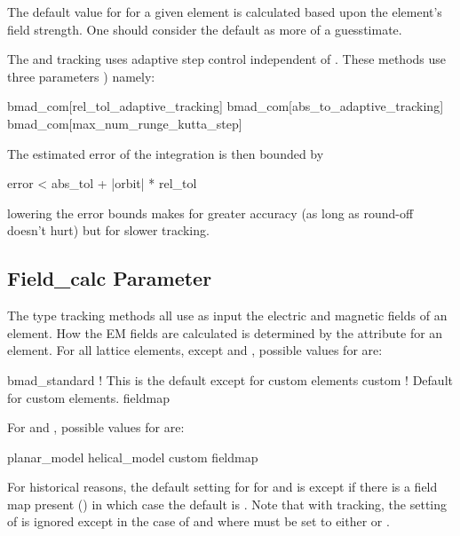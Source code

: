 The default value for  for a given element is calculated based upon the element's field
strength. One should consider the default as more of a guesstimate.

The  and  tracking uses adaptive step
control independent of . These methods use three  parameters
) namely:
\begin{example}
  bmad_com[rel_tol_adaptive_tracking]
  bmad_com[abs_to_adaptive_tracking]
  bmad_com[max_num_runge_kutta_step]
\end{example}
The estimated error of the integration is then bounded by
\begin{example}
  error < abs_tol + |orbit| * rel_tol
\end{example}
lowering the error bounds makes for greater accuracy (as long as round-off 
doesn't hurt) but for slower tracking. 

\subsection{Field_calc Parameter}
\label{s:field.calc}

The  type tracking methods all use as input the electric and magnetic fields of
an element. How the EM fields are calculated is determined by the  attribute for an
element.  For all lattice elements, except  and , possible values for
 are:
\begin{example}
  bmad_standard     ! This is the default except for custom elements
  custom            ! Default for custom elements.
  fieldmap
\end{example}
For  and , possible values for  are:
\begin{example}
  planar_model
  helical_model
  custom
  fieldmap
\end{example}
For historical reasons, the default setting for  for  and
 is  except if there is a field map present () in
which case the default is .  Note that with  tracking, the setting of
 is ignored except in the case of  and  where
 must be set to either  or .

